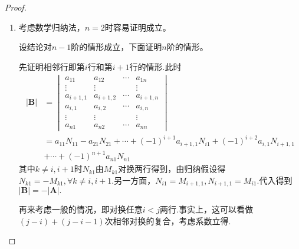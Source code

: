 {\begin{proof}
\begin{enumerate}[label = {\textup{(\arabic*)}}]
            \item 考虑数学归纳法，$n=2$时容易证明成立。

                  设结论对$n-1$阶的情形成立，下面证明$n$阶的情形。

                  先证明相邻行即第$i$行和第$i+1$行的情形.此时
                  \begin{align*}
                      \left|\bm{B}\right| & =\begin{vmatrix}
                                                 a_{11}    & a_{12}    & \cdots & a_{1n}    \\
                                                 \vdots    & \vdots    &        & \vdots    \\
                                                 a_{i+1,1} & a_{i+1,2} & \cdots & a_{i+1,n} \\
                                                 a_{i,1}   & a_{i,2}   & \cdots & a_{i,n}   \\
                                                 \vdots    & \vdots    &        & \vdots    \\
                                                 a_{n1}    & a_{n2}    & \cdots & a_{nn}
                                             \end{vmatrix}                                            \\
                                          & =a_{11}N_{11}-a_{21}N_{21}+\cdots+(-1)^{i+1}a_{i+1,1}N_{i1}+(-1)^{i+2}a_{i,1}N_{i+1,1} \\
                                          & +\cdots+(-1)^{n+1}a_{n1}N_{n1}
                  \end{align*}
                  其中$k\neq i,i+1$时$N_{k1}$由$M_{k1}$对换两行得到，由归纳假设得$N_{k1}=-M_{k1},\forall k\neq i,i+1.$另一方面，$N_{i1}=M_{i+1,1},N_{i+1,1}=M_{i1}.$代入得到$\left|\bm{B}\right|=-\left|\bm{A}\right|.$

                  再来考虑一般的情况，即对换任意$i<j$两行.事实上，这可以看做$\left(j-i\right)+\left(j-i-1\right)$次相邻对换的复合，考虑系数立得.


\end{enumerate}
\end{proof}}
